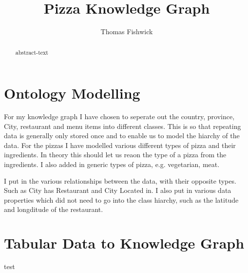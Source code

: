 \documentclass[11pt]{report} %
\title{Pizza Knowledge Graph}
\author{Thomas Fishwick}
\begin{document}
\begin{minipage}{\textwidth}
	\maketitle

	\begin{abstract}
		abstract-text
	\end{abstract}
\end{minipage}

\tableofcontents

\chapter{Ontology Modelling}

For my knowledge graph I have chosen to seperate out the country, province, City, restaurant and menu items into different classes.
This is so that repeating data is generally only stored once and to enable us to model the hiarchy of the data.
For the pizzas I have modelled various different types of pizza and their ingredients.
In theory this should let us reaon the type of a pizza from the ingredients. I also added in generic types of pizza, e.g. vegetarian, meat.

I put in the various relationships between the data, with their opposite types. Such as City has Restaurant and City Located in.
I also put in various data properties which did not need to go into the class hiarchy, such as the latitude and longditude of the restaurant.

\chapter{Tabular Data to Knowledge Graph}
test
\end{document}
